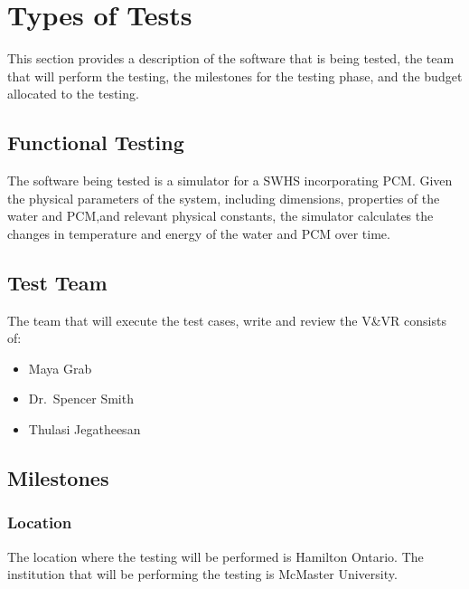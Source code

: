 \documentclass[12pt]{article}
\begin{document}
%
%

\section{Types of Tests}
This section provides a description of the software that is being tested, the team that will
perform the testing, the milestones for the testing phase, and the budget allocated to the testing. 

\subsection{Functional Testing}
The software being tested is a simulator for a SWHS
incorporating PCM. Given the physical parameters of the system,
 including dimensions, properties of the water and PCM,and relevant physical constants,
  the simulator calculates the changes in temperature and energy of the water and PCM 
  over time.

\subsection{Test Team} 
The team that will execute the test cases, write and review the V\&VR consists of:

\begin{itemize}
 \item Maya Grab 
 \item Dr.\ Spencer Smith
 \item Thulasi Jegatheesan 
\end{itemize}  

\subsection{Milestones}

\subsubsection{Location}
The location where the testing will be performed is Hamilton Ontario. The institution that
will be performing the testing is McMaster University. 


\end{document}
